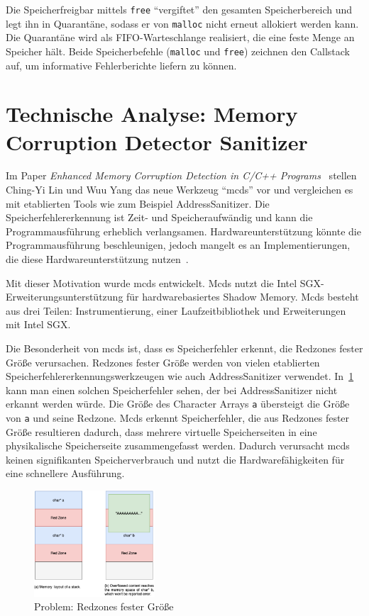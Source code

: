 \documentclass[acmtog,nonacm]{acmart}
\begin{document}
Die Speicherfreigbar mittels \verb|free| "`vergiftet"' den gesamten
Speicherbereich und legt ihn in Quarantäne, sodass er von \verb|malloc| nicht
erneut allokiert werden kann. Die Quarantäne wird als FIFO-Warteschlange
realisiert, die eine feste Menge an Speicher hält. Beide Speicherbefehle
(\verb|malloc| und \verb|free|) zeichnen den Callstack auf, um informative
Fehlerberichte liefern zu können.

\section{Technische Analyse: Memory Corruption Detector Sanitizer}

Im Paper \textit{Enhanced Memory Corruption Detection in C/C++
  Programs}~\cite{mcds_2023} stellen Ching-Yi Lin und Wuu Yang das neue Werkzeug
"`mcds"' vor und vergleichen es mit etablierten Tools wie zum Beispiel
AddressSanitizer. Die Speicherfehlererkennung ist Zeit- und Speicheraufwändig
und kann die Programmausführung erheblich verlangsamen. Hardwareunterstützung
könnte die Programmausführung beschleunigen, jedoch mangelt es an
Implementierungen, die diese Hardwareunterstützung
nutzen~\cite{hardware-asan_2024}.

Mit dieser Motivation wurde mcds entwickelt. Mcds nutzt die Intel
SGX-Erweiterungsunterstützung für hardwarebasiertes Shadow Memory. Mcds besteht
aus drei Teilen: Instrumentierung, einer Laufzeitbibliothek und Erweiterungen
mit Intel SGX.

Die Besonderheit von mcds ist, dass es Speicherfehler erkennt, die Redzones
fester Größe verursachen. Redzones fester Größe werden von vielen etablierten
Speicherfehlererkennungswerkzeugen wie auch AddressSanitizer verwendet.
In~\cref{fig:fixed-size-redzones} kann man einen solchen Speicherfehler sehen,
der bei AddressSanitizer nicht erkannt werden würde. Die Größe des Character
Arrays \lstinline{a} übersteigt die Größe von \lstinline{a} und seine Redzone.
Mcds erkennt Speicherfehler, die aus Redzones fester Größe resultieren dadurch,
dass mehrere virtuelle Speicherseiten in eine physikalische Speicherseite
zusammengefasst werden. Dadurch verursacht mcds keinen signifikanten
Speicherverbrauch und nutzt die Hardwarefähigkeiten für eine schnellere
Ausführung.

\begin{figure}[h]
  \includegraphics[width=0.4\textwidth]{img/fixed-size-redzone.png}
  \caption{Problem: Redzones fester Größe}
  \label{fig:fixed-size-redzones}
\end{figure}
\end{document}
